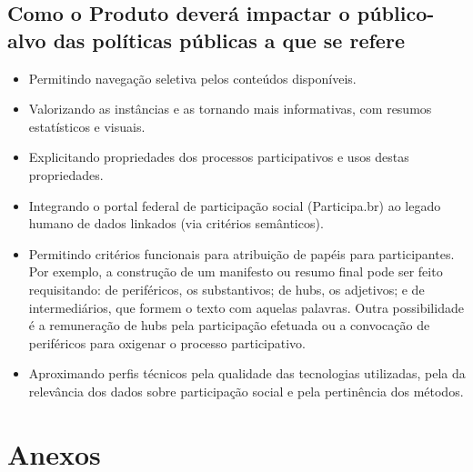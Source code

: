 \documentclass[12pt]{article}
\begin{document}
\subsection{Como o Produto deverá impactar o público-alvo das políticas públicas a que se refere}
\begin{itemize}
    \item Permitindo navegação seletiva pelos conteúdos disponíveis.
    \item Valorizando as instâncias e as tornando mais informativas, com resumos estatísticos e visuais.
    \item Explicitando propriedades dos processos participativos e usos destas propriedades.
    \item Integrando o portal federal de participação social (Participa.br) ao legado humano de dados linkados (via critérios semânticos).
    \item Permitindo critérios funcionais para atribuição de papéis para participantes. Por exemplo, a construção de um manifesto ou resumo final pode ser feito requisitando: de periféricos, os substantivos; de hubs, os adjetivos; e de intermediários, que formem o texto com aquelas palavras. Outra possibilidade é a remuneração de hubs pela participação efetuada ou a convocação de periféricos para oxigenar o processo participativo.
    \item Aproximando perfis técnicos pela qualidade das tecnologias utilizadas, pela da relevância dos dados sobre participação social e pela pertinência dos métodos.
\end{itemize}


\newpage

\newpage

\newpage
\printindex
\newpage
%
\appendix
\section{Anexos}
\end{document}
